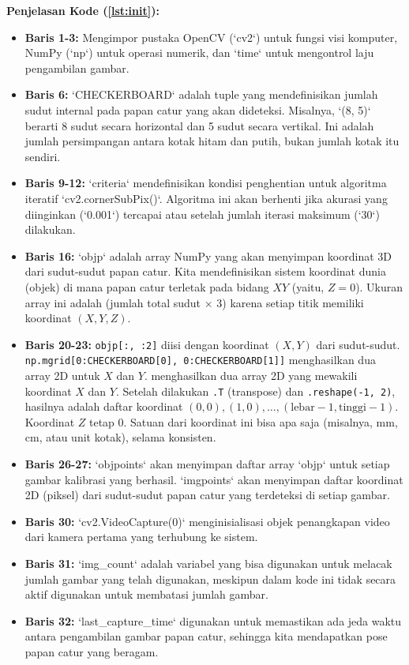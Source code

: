 \documentclass[12pt,a4paper]{article}
\begin{document}
\textbf{Penjelasan Kode (\ref{lst:init}):}
\begin{itemize}
    \item \textbf{Baris 1-3:} Mengimpor pustaka OpenCV (`cv2`) untuk fungsi visi komputer, NumPy (`np`) untuk operasi numerik, dan `time` untuk mengontrol laju pengambilan gambar.
    \item \textbf{Baris 6:} `CHECKERBOARD` adalah tuple yang mendefinisikan jumlah sudut internal pada papan catur yang akan dideteksi. Misalnya, `(8, 5)` berarti 8 sudut secara horizontal dan 5 sudut secara vertikal. Ini adalah jumlah persimpangan antara kotak hitam dan putih, bukan jumlah kotak itu sendiri.
    \item \textbf{Baris 9-12:} `criteria` mendefinisikan kondisi penghentian untuk algoritma iteratif `cv2.cornerSubPix()`. Algoritma ini akan berhenti jika akurasi yang diinginkan (`0.001`) tercapai atau setelah jumlah iterasi maksimum (`30`) dilakukan.
    \item \textbf{Baris 16:} `objp` adalah array NumPy yang akan menyimpan koordinat 3D dari sudut-sudut papan catur. Kita mendefinisikan sistem koordinat dunia (objek) di mana papan catur terletak pada bidang $XY$ (yaitu, $Z=0$). Ukuran array ini adalah (jumlah total sudut $\times$ 3) karena setiap titik memiliki koordinat $(X, Y, Z)$.
    \item \textbf{Baris 20-23:} \texttt{objp[:, :2]} diisi dengan koordinat $(X, Y)$ dari sudut-sudut.
          \texttt{np.mg\-rid[0:\-CHECKERBOARD[0],\ 0:\-CHECKERBOARD[1]]}
          menghasilkan dua array 2D untuk $X$ dan $Y$. menghasilkan dua array 2D yang mewakili koordinat $X$ dan $Y$.
          Setelah dilakukan \texttt{.T} (transpose) dan \texttt{.reshape(-1, 2)}, hasilnya adalah daftar koordinat $(0,0), (1,0), \dots, (\text{lebar}-1, \text{tinggi}-1)$.
          Koordinat $Z$ tetap 0. Satuan dari koordinat ini bisa apa saja (misalnya, mm, cm, atau unit kotak), selama konsisten.
    \item \textbf{Baris 26-27:} `objpoints` akan menyimpan daftar array `objp` untuk setiap gambar kalibrasi yang berhasil. `imgpoints` akan menyimpan daftar koordinat 2D (piksel) dari sudut-sudut papan catur yang terdeteksi di setiap gambar.
    \item \textbf{Baris 30:} `cv2.VideoCapture(0)` menginisialisasi objek penangkapan video dari kamera pertama yang terhubung ke sistem.
    \item \textbf{Baris 31:} `img\_count`
          adalah variabel yang bisa digunakan untuk melacak jumlah gambar yang telah digunakan, meskipun dalam kode ini tidak secara aktif digunakan untuk membatasi jumlah gambar.
    \item \textbf{Baris 32:} `last\_capture\_time`
          digunakan untuk memastikan ada jeda waktu antara pengambilan gambar papan catur, sehingga kita mendapatkan pose papan catur yang beragam.
\end{itemize}
\end{document}
